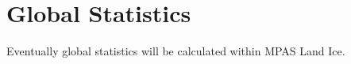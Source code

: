 \chapter{Global Statistics}
\label{chap:global_statistics}

Eventually global statistics will be calculated within MPAS Land Ice.
